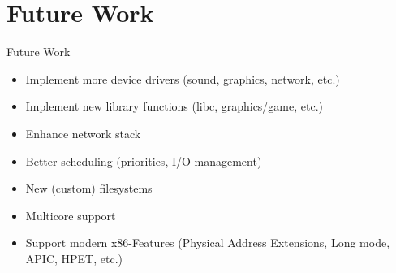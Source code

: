 \section{Future Work}

\begin{frame}{Future Work}
	\begin{itemize}
		\setlength\itemsep{1em}
		\item Implement more device drivers (sound, graphics, network, etc.)
		\item Implement new library functions (libc, graphics/game, etc.)
		\item Enhance network stack
		\item Better scheduling (priorities, I/O management)
		\item New (custom) filesystems
		\item Multicore support
		\item Support modern x86-Features (Physical Address Extensions, Long mode, APIC, HPET, etc.)
	\end{itemize}	
\end{frame}